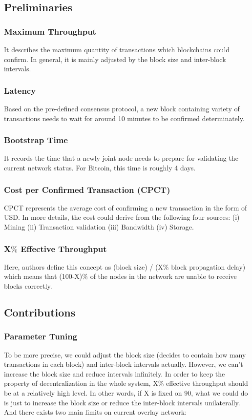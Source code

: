 \documentclass[conference]{IEEEtran}
\begin{document}
\subsection{Preliminaries}

\subsubsection{Maximum Throughput} It describes the maximum quantity of transactions which blockchains could confirm. In general, it is mainly adjusted by the block size and inter-block intervals.

\subsubsection{Latency} Based on the pre-defined consensus protocol, a new block containing variety of transactions needs to wait for around 10 minutes to be confirmed determinately.

\subsubsection{Bootstrap Time} It records the time that a newly joint node needs to prepare for validating the current network status. For Bitcoin, this time is roughly 4 days.

\subsubsection{Cost per Confirmed Transaction (CPCT)} CPCT represents the average cost of confirming a new transaction in the form of USD. 
%
In more details, the cost could derive from the following four sources: (i) Mining (ii) Transaction validation (iii) Bandwidth (iv) Storage.

\subsubsection{X$\%$ Effective Throughput} Here, authors define this concept as (block size) / (X$\%$ block propagation delay) which means that (100-X)$\%$ of the nodes in the network are unable to receive blocks correctly.


\subsection{Contributions}

\subsubsection{Parameter Tuning} 
To be more precise, we could adjust the block size (decides to contain how many transactions in each block) and inter-block intervals actually. 
%
However, we can't increase the block size and reduce intervals infinitely.
%
In order to keep the property of decentralization in the whole system, X$\%$ effective throughput should be at a relatively high level.
%
In other words, if X is fixed on 90, what we could do is just to increase the block size or reduce the inter-block intervals unilaterally.
%
And there exists two main limits on current overlay network:
\end{document}
